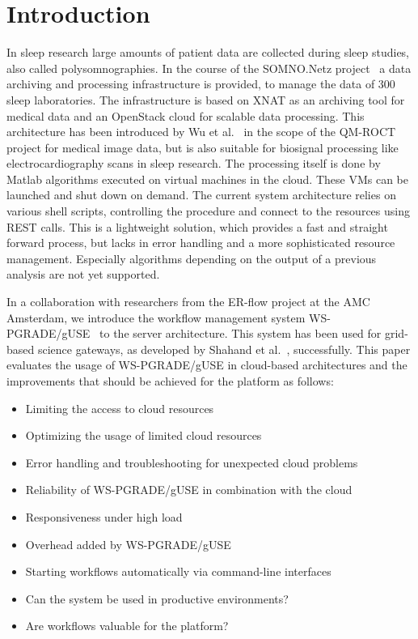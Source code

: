 \section{Introduction}\label{introduction}

In sleep research large amounts of patient data are collected during sleep studies, also called polysomnographies.
In the course of the SOMNO.Netz project~\cite{krefting13} a data archiving and processing infrastructure is provided, to manage the data of 300 sleep laboratories.
The infrastructure is based on XNAT as an archiving tool for medical data and an OpenStack cloud for scalable data processing.
This architecture has been introduced by Wu et al.~\cite{wu14} in the scope of the QM-ROCT project for medical image data, but is also suitable for biosignal processing like electrocardiography scans in sleep research.
The processing itself is done by Matlab algorithms executed on virtual machines in the cloud. These VMs can be launched and shut down on demand.
The current system architecture relies on various shell scripts, controlling the procedure and connect to the resources using REST calls.
This is a lightweight solution, which provides a fast and straight forward process, but lacks in error handling and a more sophisticated resource management.
Especially algorithms depending on the output of a previous analysis are not yet supported.

In a collaboration with researchers from the ER-flow project at the AMC Amsterdam, we introduce the workflow management system WS-PGRADE/gUSE~\cite{balasko13} to the server architecture. This system has been used for grid-based science gateways, as developed by Shahand et al.~\cite{shahand13}, successfully.
This paper evaluates the usage of WS-PGRADE/gUSE in cloud-based architectures and the improvements that should be achieved for the platform as follows:

\begin{itemize}
\item Limiting the access to cloud resources
\item Optimizing the usage of limited cloud resources
\item Error handling and troubleshooting for unexpected cloud problems
\item Reliability of WS-PGRADE/gUSE in combination with the cloud
\item Responsiveness under high load
\item Overhead added by WS-PGRADE/gUSE
\item Starting workflows automatically via command-line interfaces
\item Can the system be used in productive environments?
\item Are workflows valuable for the platform?
\end{itemize}